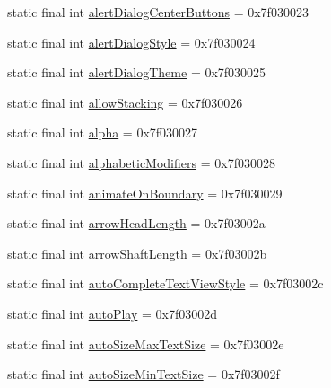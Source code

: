 \begin{DoxyCompactItemize}
\item 
static final int \mbox{\hyperlink{classcom_1_1synnapps_1_1carouselview_1_1_r_1_1attr_a6e46c4e80c63543f23f7b93eb88c3aab}{alert\+Dialog\+Center\+Buttons}} = 0x7f030023
\item 
static final int \mbox{\hyperlink{classcom_1_1synnapps_1_1carouselview_1_1_r_1_1attr_a080a601642680fd11e4c69ac7eec25c2}{alert\+Dialog\+Style}} = 0x7f030024
\item 
static final int \mbox{\hyperlink{classcom_1_1synnapps_1_1carouselview_1_1_r_1_1attr_a5330bc6d220a7c4b64630234a179685e}{alert\+Dialog\+Theme}} = 0x7f030025
\item 
static final int \mbox{\hyperlink{classcom_1_1synnapps_1_1carouselview_1_1_r_1_1attr_a3b7776351c68592081213ee290fd95aa}{allow\+Stacking}} = 0x7f030026
\item 
static final int \mbox{\hyperlink{classcom_1_1synnapps_1_1carouselview_1_1_r_1_1attr_a9e91b66f027c38ec90d89145ad68e160}{alpha}} = 0x7f030027
\item 
static final int \mbox{\hyperlink{classcom_1_1synnapps_1_1carouselview_1_1_r_1_1attr_a176c5dfa9e5be20f8fbc55eadcb2f738}{alphabetic\+Modifiers}} = 0x7f030028
\item 
static final int \mbox{\hyperlink{classcom_1_1synnapps_1_1carouselview_1_1_r_1_1attr_a936f90ea3bc6ced117d676ddf1e32ad4}{animate\+On\+Boundary}} = 0x7f030029
\item 
static final int \mbox{\hyperlink{classcom_1_1synnapps_1_1carouselview_1_1_r_1_1attr_a7d00b8411d25d647b6e5fc3b8d7dbe7c}{arrow\+Head\+Length}} = 0x7f03002a
\item 
static final int \mbox{\hyperlink{classcom_1_1synnapps_1_1carouselview_1_1_r_1_1attr_a9c8ee7b23e2e317e5d4f1fd9ce299d97}{arrow\+Shaft\+Length}} = 0x7f03002b
\item 
static final int \mbox{\hyperlink{classcom_1_1synnapps_1_1carouselview_1_1_r_1_1attr_a99f2f23071a38d5d20c9e9ceff421fee}{auto\+Complete\+Text\+View\+Style}} = 0x7f03002c
\item 
static final int \mbox{\hyperlink{classcom_1_1synnapps_1_1carouselview_1_1_r_1_1attr_afbdccdc20f1c3034189c2e2edbf0b052}{auto\+Play}} = 0x7f03002d
\item 
static final int \mbox{\hyperlink{classcom_1_1synnapps_1_1carouselview_1_1_r_1_1attr_a0ee44e35501c615840f0c140b2223a89}{auto\+Size\+Max\+Text\+Size}} = 0x7f03002e
\item 
static final int \mbox{\hyperlink{classcom_1_1synnapps_1_1carouselview_1_1_r_1_1attr_a9217fe6fe496020527de26fa72e46af4}{auto\+Size\+Min\+Text\+Size}} = 0x7f03002f

\end{DoxyCompactItemize}
